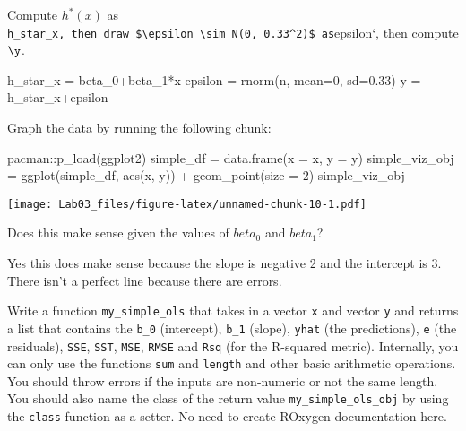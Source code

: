 \documentclass[
]{article}
\newenvironment{Shaded}{\begin{snugshade}}{\end{snugshade}}
\newcommand{\AttributeTok}[1]{\textcolor[rgb]{0.77,0.63,0.00}{#1}}
\newcommand{\DecValTok}[1]{\textcolor[rgb]{0.00,0.00,0.81}{#1}}
\newcommand{\FloatTok}[1]{\textcolor[rgb]{0.00,0.00,0.81}{#1}}
\newcommand{\FunctionTok}[1]{\textcolor[rgb]{0.00,0.00,0.00}{#1}}
\newcommand{\NormalTok}[1]{#1}
\newcommand{\OtherTok}[1]{\textcolor[rgb]{0.56,0.35,0.01}{#1}}
\newcommand{\SpecialCharTok}[1]{\textcolor[rgb]{0.00,0.00,0.00}{#1}}
\begin{document}
Compute \(h^*(x)\) as
\texttt{h\_star\_x,\ then\ draw\ \$\textbackslash{}epsilon\ \textbackslash{}sim\ N(0,\ 0.33\^{}2)\$\ as}epsilon`,
then compute \(\y\).

\begin{Shaded}
\begin{Highlighting}[]
\NormalTok{h\_star\_x }\OtherTok{=}\NormalTok{ beta\_0}\SpecialCharTok{+}\NormalTok{beta\_1}\SpecialCharTok{*}\NormalTok{x}
\NormalTok{  epsilon }\OtherTok{=} \FunctionTok{rnorm}\NormalTok{(n, }\AttributeTok{mean=}\DecValTok{0}\NormalTok{, }\AttributeTok{sd=}\FloatTok{0.33}\NormalTok{)}
\NormalTok{  y }\OtherTok{=}\NormalTok{ h\_star\_x}\SpecialCharTok{+}\NormalTok{epsilon}
\end{Highlighting}
\end{Shaded}

Graph the data by running the following chunk:

\begin{Shaded}
\begin{Highlighting}[]
\NormalTok{pacman}\SpecialCharTok{::}\FunctionTok{p\_load}\NormalTok{(ggplot2)}
\NormalTok{simple\_df }\OtherTok{=} \FunctionTok{data.frame}\NormalTok{(}\AttributeTok{x =}\NormalTok{ x, }\AttributeTok{y =}\NormalTok{ y)}
\NormalTok{simple\_viz\_obj }\OtherTok{=} \FunctionTok{ggplot}\NormalTok{(simple\_df, }\FunctionTok{aes}\NormalTok{(x, y)) }\SpecialCharTok{+} 
  \FunctionTok{geom\_point}\NormalTok{(}\AttributeTok{size =} \DecValTok{2}\NormalTok{)}
\NormalTok{simple\_viz\_obj}
\end{Highlighting}
\end{Shaded}

\texttt{[image: Lab03\_files/figure-latex/unnamed-chunk-10-1.pdf]}

Does this make sense given the values of \(beta_0\) and \(beta_1\)?

Yes this does make sense because the slope is negative 2 and the
intercept is 3. There isn't a perfect line because there are errors.

Write a function \texttt{my\_simple\_ols} that takes in a vector
\texttt{x} and vector \texttt{y} and returns a list that contains the
\texttt{b\_0} (intercept), \texttt{b\_1} (slope), \texttt{yhat} (the
predictions), \texttt{e} (the residuals), \texttt{SSE}, \texttt{SST},
\texttt{MSE}, \texttt{RMSE} and \texttt{Rsq} (for the R-squared metric).
Internally, you can only use the functions \texttt{sum} and
\texttt{length} and other basic arithmetic operations. You should throw
errors if the inputs are non-numeric or not the same length. You should
also name the class of the return value \texttt{my\_simple\_ols\_obj} by
using the \texttt{class} function as a setter. No need to create ROxygen
documentation here.
\end{document}
